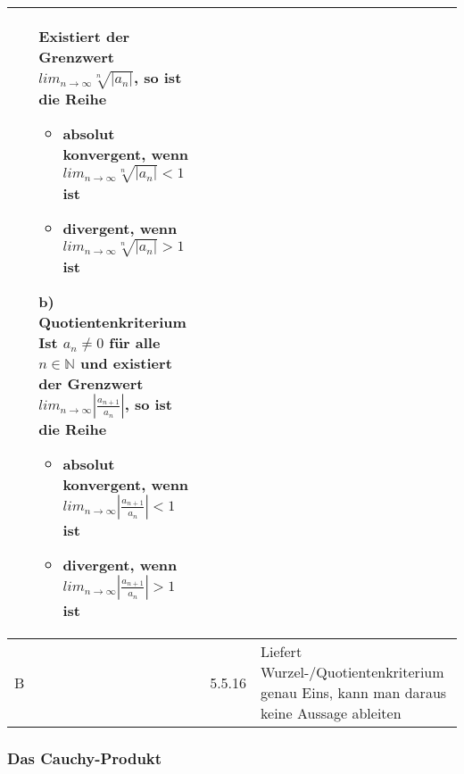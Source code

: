 \begin{longtable}{p{0.75cm} p{1cm} p{16cm}}
\begin{itemize}[topsep=-0.5cm]
                                    Existiert der Grenzwert $lim_{n \rightarrow \infty} \sqrt[n]{|a_n|}$, so ist die Reihe
                                    \begin{itemize}[topsep=-0.5cm]
                                        \item absolut konvergent, wenn $lim_{n \rightarrow \infty} \sqrt[n]{|a_n|} < 1$ ist
                                        \item divergent, wenn $lim_{n \rightarrow \infty} \sqrt[n]{|a_n|} > 1$ ist
                                    \end{itemize}
                            \item[b)] \textbf{Quotientenkriterium} \hfill \break
                                    Ist $a_n \neq 0$ für alle $n \in \mathbb{N}$ und existiert der Grenzwert 
                                    $lim_{n \rightarrow \infty} |\frac{a_{n+1}}{a_n}|$, so ist die Reihe
                                    \begin{itemize}[topsep=-0.5cm]
                                        \item absolut konvergent, wenn $lim_{n \rightarrow \infty} |\frac{a_{n+1}}{a_n}| < 1$ ist
                                        \item divergent, wenn $lim_{n \rightarrow \infty} |\frac{a_{n+1}}{a_n}| > 1$ ist
                                    \end{itemize}
                        \end{itemize} \vspace{-0cm} \\
        \midrule
        B   & 5.5.16&   Liefert Wurzel-/Quotientenkriterium genau Eins, kann man daraus keine Aussage ableiten \\
        \bottomrule

    \end{longtable}

\subsubsection{Das Cauchy-Produkt}

